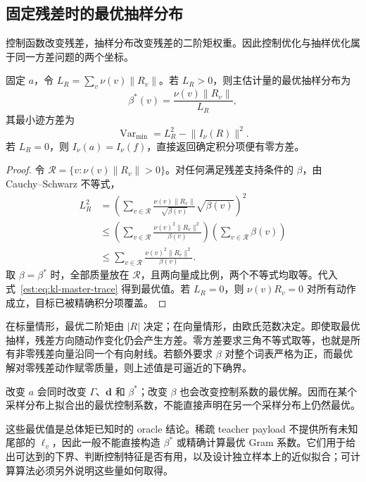 \documentclass[lang=cn,scheme=chinese,openany]{../book/elegantbook}
\newcommand{\Var}{\operatorname{Var}}
\begin{document}
\subsection{固定残差时的最优抽样分布}

控制函数改变残差，抽样分布改变残差的二阶矩权重。因此控制优化与抽样优化属于同一方差问题的两个坐标。

\begin{theorem}[残差范数决定迹方差最优抽样]
\label{est:thm:kl-master-proposal}
固定 $a$，令 $L_R=\sum_v\nu(v)\lVert R_v\rVert$。若 $L_R>0$，则主估计量的最优抽样分布为
\begin{equation*}
 \beta^*(v)=\frac{\nu(v)\lVert R_v\rVert}{L_R},
\end{equation*}
其最小迹方差为
\begin{equation*}
 \Var_{\min}=L_R^2-\lVert I_\nu(R)\rVert^2.
\end{equation*}
若 $L_R=0$，则 $I_\nu(a)=I_\nu(f)$，直接返回确定积分项便有零方差。
\end{theorem}

\begin{proof}
令 $\mathcal R=\{v:\nu(v)\lVert R_v\rVert>0\}$。对任何满足残差支持条件的 $\beta$，由 Cauchy--Schwarz 不等式，
\begin{align*}
 L_R^2
 &=\left(\sum_{v\in\mathcal R}\frac{\nu(v)\lVert R_v\rVert}{\sqrt{\beta(v)}}\sqrt{\beta(v)}\right)^2\\
 &\le\left(\sum_{v\in\mathcal R}\frac{\nu(v)^2\lVert R_v\rVert^2}{\beta(v)}\right)
       \left(\sum_{v\in\mathcal R}\beta(v)\right)\\
 &\le\sum_{v\in\mathcal R}\frac{\nu(v)^2\lVert R_v\rVert^2}{\beta(v)}.
\end{align*}
取 $\beta=\beta^*$ 时，全部质量放在 $\mathcal R$，且两向量成比例，两个不等式均取等。代入式~\eqref{est:eq:kl-master-trace} 得到最优值。若 $L_R=0$，则 $\nu(v)R_v=0$ 对所有动作成立，目标已被精确积分项覆盖。
\end{proof}

在标量情形，最优二阶矩由 $\lvert R\rvert$ 决定；在向量情形，由欧氏范数决定。即使取最优抽样，残差方向随动作变化仍会产生方差。零方差要求三角不等式取等，也就是所有非零残差向量沿同一个有向射线。若额外要求 $\beta$ 对整个词表严格为正，而最优解对零残差动作赋零质量，则上述值是可逼近的下确界。

改变 $a$ 会同时改变 $\Gamma$、$\mathbf d$ 和 $\beta^*$；改变 $\beta$ 也会改变控制系数的最优解。因而在某个采样分布上拟合出的最优控制系数，不能直接声明在另一个采样分布上仍然最优。

这些最优值是总体矩已知时的 oracle 结论。稀疏 teacher payload 不提供所有未知尾部的 $\ell_v$，因此一般不能直接构造 $\beta^*$ 或精确计算最优 Gram 系数。它们用于给出可达到的下界、判断控制特征是否有用，以及设计独立样本上的近似拟合；可计算算法必须另外说明这些量如何取得。
\end{document}
